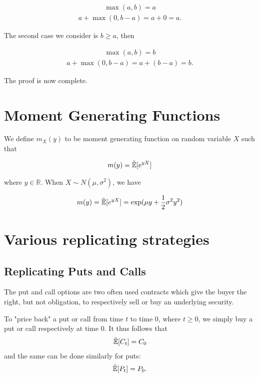 \documentclass[reqno]{amsart}
\newcommand{\rE}[1]{\tilde{\E}[#1]}
\begin{document}
\begin{align}
     \max(a, b) = a
\end{align}
\begin{align}
     a + \max(0, b-a) = a + 0 = a.
\end{align}

The second case we consider is $b \geq a$, then

\begin{align}
     \max(a, b) = b
\end{align}
\begin{align}
     a + \max(0, b-a) = a + (b - a) = b.
\end{align}

The proof is now complete.

\section{Moment Generating Functions}

We define $m_X(y)$ to be moment generating function on random variable $X$ such that 

\begin{align}
     m(y) = \rE{e^{yX}}
\end{align}

where $y \in \mathbb{R}$. When $X \sim N(\mu, \sigma^2)$, we have 

\begin{align} \label{mgf func}
     m(y) = \rE{e^{yX}} = \exp(\mu y + \frac{1}{2} \sigma^2 y^2)
\end{align}

\section{Various replicating strategies}

\subsection{Replicating Puts and Calls}

The put and call options are two often used contracts which give the buyer the right, but not obligation, to respectively sell or buy an underlying security. 


To "price back" a put or call from time $t$ to time $0$, where $t \geq 0$, we simply buy a put or call respectively at time $0$. 
It thus follows that 
\begin{align}
     \rE{C_t} = C_0
\end{align}
and the same can be done similarly for puts:
\begin{align}
     \rE{P_t} = P_0.
\end{align}
\end{document}
